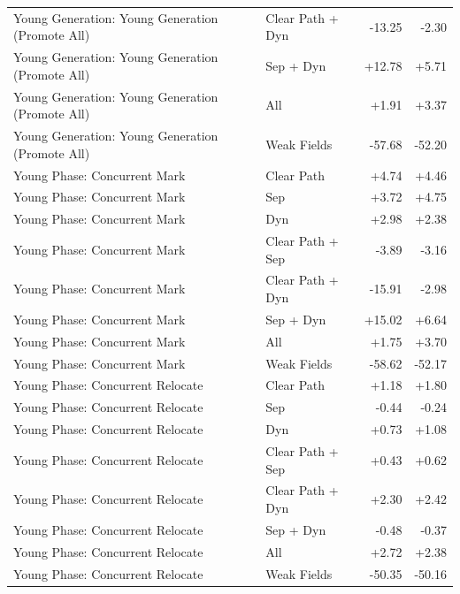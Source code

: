 \begin{table}[t]
\begin{tabular}{llrr}
Young Generation: Young Generation (Promote All) & Clear Path + Dyn & -13.25 & -2.30 \\
Young Generation: Young Generation (Promote All) & Sep + Dyn & +12.78 & +5.71 \\
Young Generation: Young Generation (Promote All) & All & +1.91 & +3.37 \\
Young Generation: Young Generation (Promote All) & Weak Fields & -57.68 & -52.20 \\
Young Phase: Concurrent Mark & Clear Path & +4.74 & +4.46 \\
Young Phase: Concurrent Mark & Sep & +3.72 & +4.75 \\
Young Phase: Concurrent Mark & Dyn & +2.98 & +2.38 \\
Young Phase: Concurrent Mark & Clear Path + Sep & -3.89 & -3.16 \\
Young Phase: Concurrent Mark & Clear Path + Dyn & -15.91 & -2.98 \\
Young Phase: Concurrent Mark & Sep + Dyn & +15.02 & +6.64 \\
Young Phase: Concurrent Mark & All & +1.75 & +3.70 \\
Young Phase: Concurrent Mark & Weak Fields & -58.62 & -52.17 \\
Young Phase: Concurrent Relocate & Clear Path & +1.18 & +1.80 \\
Young Phase: Concurrent Relocate & Sep & -0.44 & -0.24 \\
Young Phase: Concurrent Relocate & Dyn & +0.73 & +1.08 \\
Young Phase: Concurrent Relocate & Clear Path + Sep & +0.43 & +0.62 \\
Young Phase: Concurrent Relocate & Clear Path + Dyn & +2.30 & +2.42 \\
Young Phase: Concurrent Relocate & Sep + Dyn & -0.48 & -0.37 \\
Young Phase: Concurrent Relocate & All & +2.72 & +2.38 \\
Young Phase: Concurrent Relocate & Weak Fields & -50.35 & -50.16 \\
\bottomrule
\end{tabular}
\end{table}
